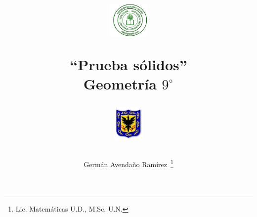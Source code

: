 \documentclass[10pt,letterpaper,addpoints]{exam}
\begin{document}
\title{\begin{minipage}{.2\textwidth}
        \includegraphics[height=1.75cm]{Images/logo-colegio.png}
       \end{minipage}
\begin{minipage}{.55\textwidth}
 \begin{center}
``Prueba sólidos''\\Geometría $9^{\circ}$
\end{center}
\end{minipage}
\begin{minipage}{.2\textwidth}
\includegraphics[height=1.75cm]{Images/logo-sed.png} 
\end{minipage}
}
\author{Germ\'{a}n Avendaño Ram\'{i}rez~\thanks{Lic. Matemáticas U.D., M.Sc. U.N.}}
\date{}
\maketitle
\begin{center}
\end{center}
\vspace{0.1in}
\end{document}
